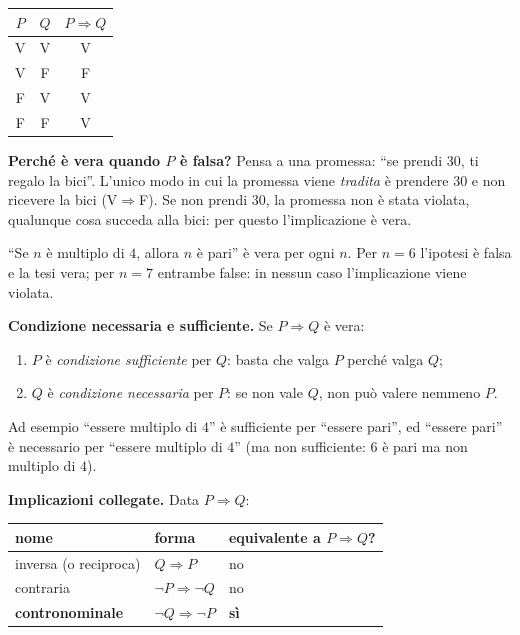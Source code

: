 \documentclass[11pt,a4paper]{article}
\newcommand{\V}{\textsf{V}}
\newcommand{\F}{\textsf{F}}
\begin{document}
\begin{center}
\begin{tabular}{cc|c}
$P$ & $Q$ & $P \Rightarrow Q$ \\ \hline
\V & \V & \V \\
\V & \F & \F \\
\F & \V & \V \\
\F & \F & \V
\end{tabular}
\end{center}

\textbf{Perché è vera quando $P$ è falsa?} Pensa a una promessa: ``se
prendi 30, ti regalo la bici''. L'unico modo in cui la promessa viene
\emph{tradita} è prendere 30 e non ricevere la bici (\V$\Rightarrow$\F).
Se non prendi 30, la promessa non è stata violata, qualunque cosa succeda
alla bici: per questo l'implicazione è vera.

\begin{esempio}
``Se $n$ è multiplo di $4$, allora $n$ è pari'' è vera per ogni $n$.
Per $n = 6$ l'ipotesi è falsa e la tesi vera; per $n = 7$ entrambe false:
in nessun caso l'implicazione viene violata.
\end{esempio}

\textbf{Condizione necessaria e sufficiente.} Se $P \Rightarrow Q$ è vera:
\begin{enumerate}
    \item $P$ è \emph{condizione sufficiente} per $Q$: basta che valga $P$
          perché valga $Q$;
    \item $Q$ è \emph{condizione necessaria} per $P$: se non vale $Q$, non
          può valere nemmeno $P$.
\end{enumerate}
Ad esempio ``essere multiplo di $4$'' è sufficiente per ``essere pari'', ed
``essere pari'' è necessario per ``essere multiplo di $4$'' (ma non
sufficiente: $6$ è pari ma non multiplo di $4$).

\textbf{Implicazioni collegate.} Data $P \Rightarrow Q$:
\begin{center}
\begin{tabular}{l|l|l}
nome & forma & equivalente a $P \Rightarrow Q$? \\ \hline
inversa (o reciproca) & $Q \Rightarrow P$ & no \\
contraria & $\neg P \Rightarrow \neg Q$ & no \\
\textbf{contronominale} & $\neg Q \Rightarrow \neg P$ & \textbf{sì}
\end{tabular}
\end{center}
\end{document}
